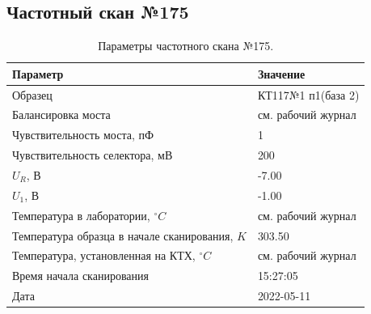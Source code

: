 \subsection{Частотный скан №175}
\begin{table}[!ht]
    \centering
    \caption{Параметры частотного скана №175.}
    \begin{tabular}{|l|l|}
        \hline
        Параметр                                       & Значение                  \\ \hline
        Образец                                        & КТ117№1 п1(база 2)        \\ \hline
        Балансировка моста                             & см. рабочий журнал        \\ \hline
        Чувствительность моста, пФ                     & 1                         \\ \hline
        Чувствительность селектора, мВ                 & 200                       \\ \hline
        $U_R$, В                                       & -7.00                     \\ \hline
        $U_1$, В                                       & -1.00                     \\ \hline
        Температура в лаборатории, $^\circ C$          & см. рабочий журнал        \\ \hline
        Температура образца в начале сканирования, $K$ & 303.50                    \\ \hline
        Температура, установленная на КТХ, $^\circ C$  & см. рабочий журнал        \\ \hline
        Время начала сканирования                      & 15:27:05                  \\ \hline
        Дата                                           & 2022-05-11                \\ \hline
    \end{tabular}
    \label{table:frequency_scan_175}
\end{table}

